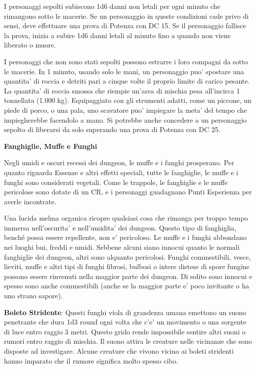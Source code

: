 \documentclass[a4paper,11pt,twoside,openany]{dndbook}
\begin{document}
I personaggi sepolti subiscono 1d6 danni non letali per ogni minuto che rimangono sotto le macerie. Se un personaggio in queste condizioni cade privo di sensi, deve effettuare una prova di Potenza con DC 15. Se il personaggio fallisce la prova, inizia a subire 1d6 danni letali al minuto fino a quando non viene liberato o muore.

I personaggi che non sono stati sepolti possono estrarre i loro compagni da sotto le macerie. In 1 minuto, usando solo le mani, un personaggio puo' spostare una quantita' di roccia e detriti pari a cinque volte il proprio limite di carico pesante. La quantita' di roccia smossa che riempie un'area di mischia pesa all'incirca 1 tonnellata (1.000 kg). Equipaggiato con gli strumenti adatti, come un piccone, un piede di porco, o una pala, uno scavatore puo' impiegare la meta' del tempo che impiegherebbe facendolo a mano. Si potrebbe anche concedere a un personaggio sepolto di liberarsi da solo superando una prova di Potenza con DC 25.

\textbf{Fanghiglie, Muffe e Funghi}

Negli umidi e oscuri recessi dei dungeon, le muffe e i funghi prosperano. Per quanto riguarda Essenze e altri effetti speciali, tutte le fanghiglie, le muffe e i funghi sono considerati vegetali. Come le trappole, le fanghiglie e le muffe pericolose sono dotate di un CR, e i personaggi guadagnano Punti Esperienza per averle incontrate.

Una lucida melma organica ricopre qualsiasi cosa che rimanga per troppo tempo immersa nell'oscurita' e nell'umidita' dei dungeon. Questo tipo di fanghiglia, benché possa essere repellente, non e' pericoloso. Le muffe e i funghi abbondano nei luoghi bui, freddi e umidi. Sebbene alcuni siano innocui quanto le normali fanghiglie dei dungeon, altri sono alquanto pericolosi. Funghi commestibili, vesce, lieviti, muffe e altri tipi di funghi fibrosi, bulbosi o intere distese di spore fungine possono essere rinvenuti nella maggior parte dei dungeon. Di solito sono innocui e spesso sono anche commestibili (anche se la maggior parte e' poco invitante o ha uno strano sapore).

\textbf{Boleto Stridente}: Questi funghi viola di grandezza umana emettono un suono penetrante che dura 1d3 round ogni volta che c'e' un movimento o una sorgente di luce entro raggio 3 metri. Questo grido rende impossibile sentire altri suoni o rumori entro raggio di mischia. Il suono attira le creature nelle vicinanze che sono disposte ad investigare. Alcune creature che vivono vicino ai boleti stridenti hanno imparato che il rumore significa molto spesso cibo.
\end{document}
